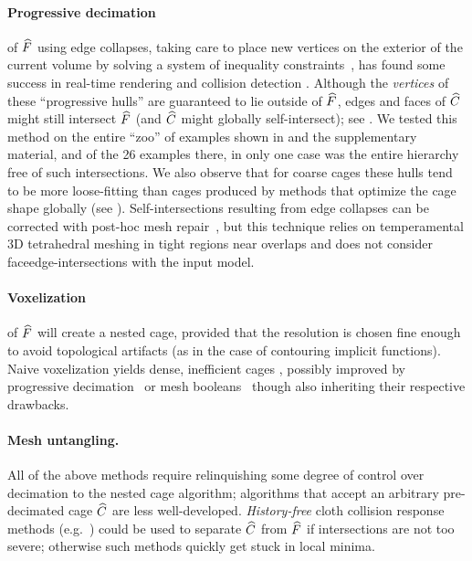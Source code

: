 \paragraph{Progressive decimation} of $\widehat{F}$ using edge collapses, taking care
to place new vertices on the exterior of the current volume by solving a system
of inequality constraints~\cite{Sander:2000:SC}, has found some success in
real-time rendering and collision detection \cite{Platis:CGF}.  Although
the \emph{vertices} of these ``progressive hulls'' are guaranteed to lie
outside of $\widehat{F}$, edges and faces of $\widehat{C}$ might still
intersect $\widehat{F}$ (and $\widehat{C}$ might globally self-intersect); see
. We tested this method on the entire ``zoo'' of
examples shown in  and the supplementary material, and of the 26
examples there, in only one case was the entire hierarchy free of such
intersections. We also observe that for coarse cages these hulls tend to be
more loose-fitting than cages produced by methods that optimize the cage shape
globally (see ).  Self-intersections resulting from
edge collapses can be corrected with post-hoc mesh repair~\cite{Deng:2011vr},
but this technique relies on temperamental 3D tetrahedral meshing in tight
regions near overlaps and does not consider faceedge-intersections with
the input model.

\paragraph{Voxelization} of $\widehat{F}$ will create a nested cage, provided that
the resolution is chosen fine enough to avoid topological
artifacts (as in the case of contouring implicit functions). Naive voxelization
yields dense, inefficient cages \cite{Mehra:2009:AMS}, possibly improved by
progressive decimation~\cite{Xian:2009} or mesh booleans~\cite{Xian:2015}
though also inheriting their respective drawbacks.

\paragraph{Mesh untangling.}
%
All of the above methods require relinquishing some degree of control over
decimation to the nested cage algorithm; algorithms that accept an arbitrary
pre-decimated cage $\widehat{C}$ are less well-developed. \emph{History-free} cloth
collision response methods (e.g.\
\cite{Baraff:2003:UC,Volino:2006:RSC,Wicke:2006,Ye:2012:ICM}) could be used to
separate $\widehat{C}$ from $\widehat{F}$ if intersections are not too severe; otherwise
such methods quickly get stuck in local minima.


